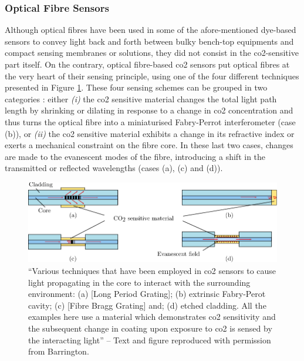 \subsubsection{Optical Fibre Sensors}\label{subsect:choos:review:fibre_optic}

Although optical fibres have been used in some of the afore-mentioned dye-based sensors to convey light back and forth between bulky bench-top equipments and compact sensing membranes or solutions\cite{he1995, lu2008, degrandpre1999}, they did not consist in the \gls{co2}-sensitive part itself. On the contrary, optical fibre-based \gls{co2} sensors put optical fibres at the very heart of their sensing principle, using one of the four different techniques presented in Figure \ref{fig:choos:review:fibre_optic}. These four sensing schemes can be grouped in two categories : either \textit{(i)} the \gls{co2} sensitive material changes the total light path length by shrinking or dilating in response to a change in \gls{co2} concentration and thus turns the optical fibre into a miniaturised Fabry-Perrot interferometer (case (b)), or \textit{(ii)} the \gls{co2} sensitive material exhibits a change in its refractive index or exerts a mechanical constraint on the fibre core. In these last two cases, changes are made to the evanescent modes of the fibre, introducing a shift in the transmitted or reflected wavelengths (cases (a), (c) and (d)).

\begin{figure}
	\centering
	\includegraphics{1_main_matter/choos_figures/review/fibre_optics_barrington}
	\caption[Fibre optic sensor variations.]{\enquote{Various techniques that have been employed in \gls{co2} sensors to cause light propagating in the core to interact with the surrounding environment: (a) [Long Period Grating]; (b) extrinsic Fabry-Perot cavity; (c) [Fibre Bragg Grating] and; (d) etched cladding. All the examples here use a material which demonstrates \gls{co2} sensitivity and the subsequent change in coating upon exposure to \gls{co2} is sensed by the interacting light} -- Text and figure reproduced with permission from Barrington\cite{barrington2018}.}
	\label{fig:choos:review:fibre_optic}
\end{figure}

